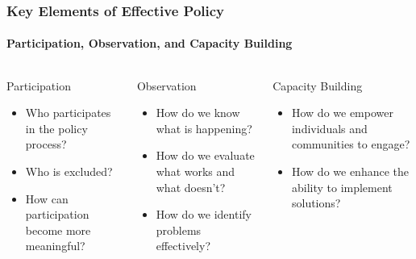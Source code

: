 \documentclass[10pt]{beamer}
\begin{document}
\begin{frame}
\frametitle{Key Elements of Effective Policy}
\framesubtitle{Participation, Observation, and Capacity Building}

\begin{columns}
\begin{column}{0.32\textwidth}
\begin{block}{Participation}
\pause
\begin{itemize}
\item Who participates in the policy process?
\item Who is excluded?
\item How can participation become more meaningful?
\end{itemize}
\end{block}
\end{column}

\begin{column}{0.32\textwidth}
\begin{block}{Observation}
\pause
\begin{itemize}
\item How do we know what is happening?
\item How do we evaluate what works and what doesn't?
\item How do we identify problems effectively?
\end{itemize}
\end{block}
\end{column}

\begin{column}{0.32\textwidth}
\begin{block}{Capacity Building}
\pause
\begin{itemize}
\item How do we empower individuals and communities to engage?
\item How do we enhance the ability to implement solutions?
\end{itemize}
\end{block}
\end{column}
\end{columns}

\end{frame}
\end{document}

